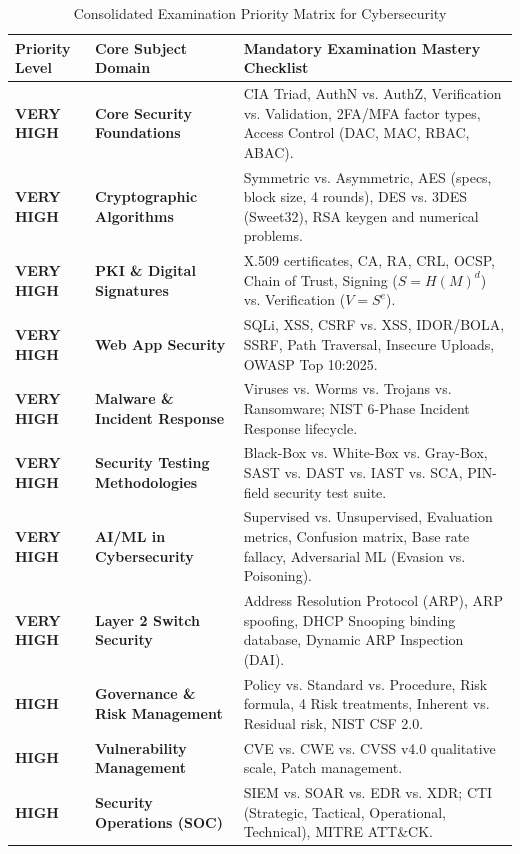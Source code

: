 \begin{table}[htbp]
\centering
\caption{Consolidated Examination Priority Matrix for Cybersecurity}
\label{tab:high_priority_matrix}
\begin{tabularx}{\textwidth}{l p{4.2cm} X}
\toprule
\textbf{Priority Level} & \textbf{Core Subject Domain} & \textbf{Mandatory Examination Mastery Checklist} \\
\midrule
\textbf{VERY HIGH} & \textbf{Core Security Foundations} & CIA Triad, AuthN vs. AuthZ, Verification vs. Validation, 2FA/MFA factor types, Access Control (DAC, MAC, RBAC, ABAC). \\
\textbf{VERY HIGH} & \textbf{Cryptographic Algorithms} & Symmetric vs. Asymmetric, AES (specs, block size, 4 rounds), DES vs. 3DES (Sweet32), RSA keygen and numerical problems. \\
\textbf{VERY HIGH} & \textbf{PKI \& Digital Signatures} & X.509 certificates, CA, RA, CRL, OCSP, Chain of Trust, Signing ($S=H(M)^d$) vs. Verification ($V=S^e$). \\
\textbf{VERY HIGH} & \textbf{Web App Security} & SQLi, XSS, CSRF vs. XSS, IDOR/BOLA, SSRF, Path Traversal, Insecure Uploads, OWASP Top 10:2025. \\
\textbf{VERY HIGH} & \textbf{Malware \& Incident Response} & Viruses vs. Worms vs. Trojans vs. Ransomware; NIST 6-Phase Incident Response lifecycle. \\
\textbf{VERY HIGH} & \textbf{Security Testing Methodologies} & Black-Box vs. White-Box vs. Gray-Box, SAST vs. DAST vs. IAST vs. SCA, PIN-field security test suite. \\
\textbf{VERY HIGH} & \textbf{AI/ML in Cybersecurity} & Supervised vs. Unsupervised, Evaluation metrics, Confusion matrix, Base rate fallacy, Adversarial ML (Evasion vs. Poisoning). \\
\textbf{VERY HIGH} & \textbf{Layer 2 Switch Security} & Address Resolution Protocol (ARP), ARP spoofing, DHCP Snooping binding database, Dynamic ARP Inspection (DAI). \\
\textbf{HIGH} & \textbf{Governance \& Risk Management} & Policy vs. Standard vs. Procedure, Risk formula, 4 Risk treatments, Inherent vs. Residual risk, NIST CSF 2.0. \\
\textbf{HIGH} & \textbf{Vulnerability Management} & CVE vs. CWE vs. CVSS v4.0 qualitative scale, Patch management. \\
\textbf{HIGH} & \textbf{Security Operations (SOC)} & SIEM vs. SOAR vs. EDR vs. XDR; CTI (Strategic, Tactical, Operational, Technical), MITRE ATT\&CK. \\

\end{tabularx}
\end{table}
